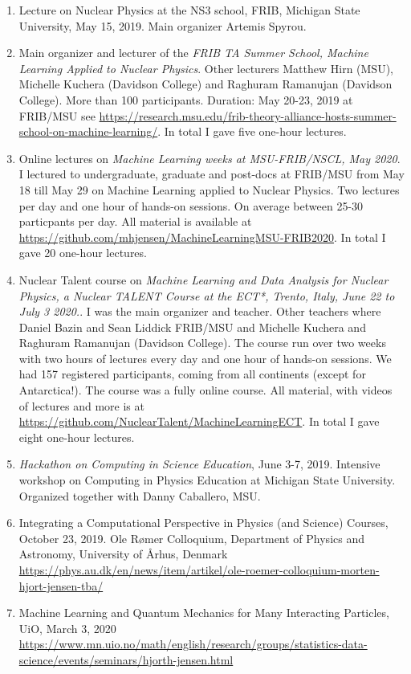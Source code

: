 \documentclass[prc,amsart,english,superscriptaddress,showpacs,floatfix]{revtex4}
\begin{document}
\begin{enumerate}
\item Lecture on Nuclear Physics at the NS3 school, FRIB, Michigan State University, May 15, 2019. Main organizer Artemis Spyrou. 
\item Main organizer and lecturer of the {\em FRIB TA Summer School, Machine Learning Applied to Nuclear Physics}. Other lecturers Matthew Hirn (MSU), Michelle Kuchera (Davidson College) and Raghuram Ramanujan  (Davidson College). More than 100 participants. Duration: May 20-23, 2019 at FRIB/MSU see \url{https://research.msu.edu/frib-theory-alliance-hosts-summer-school-on-machine-learning/}. In total I gave five one-hour lectures.
\item Online lectures on {\em Machine Learning weeks at MSU-FRIB/NSCL, May 2020}. I lectured to undergraduate, graduate and post-docs at FRIB/MSU from May 18 till May 29 on Machine Learning applied to Nuclear Physics. Two lectures per day and one hour of hands-on sessions. On average between 25-30 particpants per day. All material is available at \url{https://github.com/mhjensen/MachineLearningMSU-FRIB2020}. In total I gave 20 one-hour lectures.
\item Nuclear Talent course on {\em Machine Learning and Data Analysis for Nuclear Physics, a Nuclear TALENT Course at the ECT*, Trento, Italy, June 22 to July 3 2020.}. I was the main organizer and teacher. Other teachers where Daniel Bazin and Sean Liddick FRIB/MSU and   Michelle Kuchera and Raghuram Ramanujan  (Davidson College). The course run over two weeks with two hours of lectures every day and one hour of hands-on sessions. We had 157 registered participants, coming from all continents (except for Antarctica!). The course was a fully online course. All material, with videos of lectures and more is at \url{https://github.com/NuclearTalent/MachineLearningECT}. In total I gave eight one-hour lectures.
\item {\em Hackathon on Computing in Science Education}, June 3-7, 2019. Intensive workshop on Computing in Physics Education at Michigan State University. Organized together with Danny Caballero, MSU.
\item Integrating a Computational Perspective in Physics (and Science) Courses, October 23, 2019. Ole R\o mer Colloquium, Department of Physics and Astronomy, University of \AA rhus, Denmark  \url{https://phys.au.dk/en/news/item/artikel/ole-roemer-colloquium-morten-hjort-jensen-tba/}
\item  Machine Learning and Quantum Mechanics for Many Interacting Particles, UiO, March 3, 2020  \url{https://www.mn.uio.no/math/english/research/groups/statistics-data-science/events/seminars/hjorth-jensen.html}

\end{enumerate}
\end{document}
